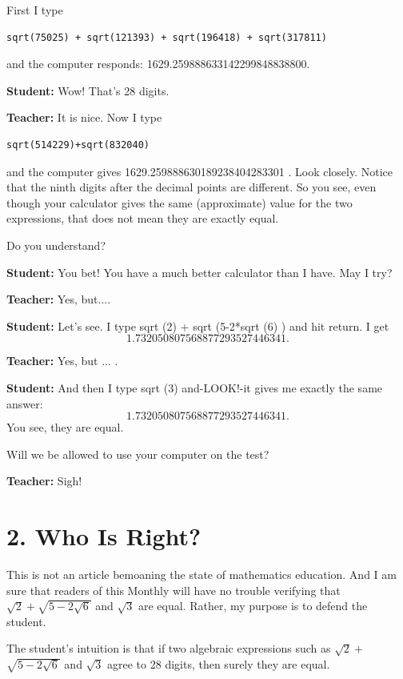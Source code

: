 \documentclass[11pt,letterpaper]{article}
\begin{document}
First I type

\begin{verbatim}
sqrt(75025) + sqrt(121393) + sqrt(196418) + sqrt(317811)
\end{verbatim}

and the computer responds: 1629.259888633142299848838800.

\noindent\textbf{Student:} Wow! That's 28 digits.

\noindent\textbf{Teacher:} It is nice. Now I type

\begin{verbatim}
sqrt(514229)+sqrt(832040)
\end{verbatim}

and the computer gives 1629.259888630189238404283301 . Look closely. Notice that the ninth digits after the decimal points are different. So you see, even though your calculator gives the same (approximate) value for the two expressions, that does not mean they are exactly equal.

Do you understand?

\noindent\textbf{Student:} You bet! You have a much better calculator than I have. May I try?

\noindent\textbf{Teacher:} Yes, but....

\noindent\textbf{Student:} Let's see. I type sqrt (2) + sqrt (5-2*sqrt (6) ) and hit return. I get \[1.732050807568877293527446341.\]

\noindent\textbf{Teacher:} Yes, but ... .

\noindent\textbf{Student:} And then I type sqrt (3) and-LOOK!-it gives me exactly the same answer: \[1.732050807568877293527446341.\] You see, they are equal.

Will we be allowed to use your computer on the test?

\noindent\textbf{Teacher:} Sigh!

\section*{2. Who Is Right?} This is not an article bemoaning the state of mathematics education. And I am sure that readers of this Monthly will have no trouble verifying that $\sqrt{2}+\sqrt{5-2 \sqrt{6}}$ and $\sqrt{3}$ are equal. Rather, my purpose is to defend the student.

The student's intuition is that if two algebraic expressions such as $\sqrt{2}+$ $\sqrt{5-2 \sqrt{6}}$ and $\sqrt{3}$ agree to 28 digits, then surely they are equal.
\end{document}
